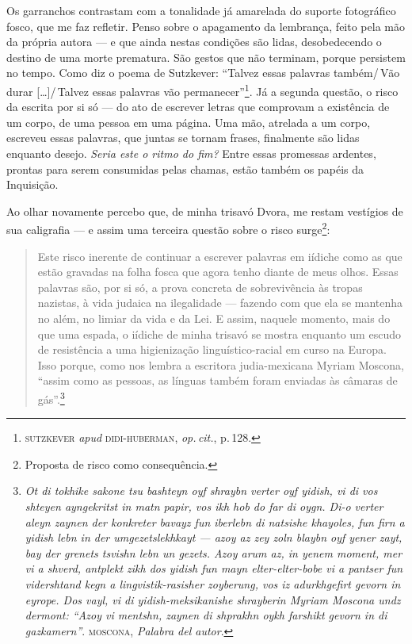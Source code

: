 Os garranchos contrastam com a tonalidade já amarelada do suporte
fotográfico fosco, que me faz refletir. Penso sobre o apagamento da
lembrança, feito pela mão da própria autora --- e que ainda nestas
condições são lidas, desobedecendo o destino de uma morte prematura. São
gestos que não terminam, porque persistem no tempo. Como diz o poema de
Sutzkever: ``Talvez essas palavras também/\,Vão durar {[}\ldots{}{]}/\,Talvez essas palavras vão permanecer''\footnote{\textsc{sutzkever}
  \emph{apud} \textsc{didi-huberman}, \emph{op.\,cit.}, p.\,128.}. Já a segunda questão, o risco
da escrita por si só --- do ato de escrever letras que comprovam a
existência de um corpo, de uma pessoa em uma página. Uma mão, atrelada a
um corpo, escreveu essas palavras, que juntas se tornam frases,
finalmente são lidas enquanto desejo. \emph{Seria este o ritmo do fim?}
Entre essas promessas ardentes, prontas para serem consumidas pelas
chamas, estão também os papéis da Inquisição.

Ao olhar novamente percebo que, de minha trisavó Dvora, me restam
vestígios de sua caligrafia --- e assim uma terceira questão sobre o
risco surge\footnote{Proposta de risco como consequência.}:


\begin{quote}
Este risco inerente de continuar a escrever
  palavras em iídiche como as que estão gravadas na folha fosca
  que agora tenho diante de meus olhos. Essas palavras são, por si só, a
  prova concreta de sobrevivência às tropas nazistas, à vida judaica na
  ilegalidade --- fazendo com que ela se mantenha no além, no limiar da
  vida e da Lei. E assim, naquele momento, mais do que uma espada, o
  iídiche de minha trisavó se mostra enquanto um escudo de
  resistência a uma higienização linguístico-racial em curso na Europa.
  Isso porque, como nos lembra a escritora judia-mexicana Myriam
  Moscona, ``assim como as pessoas, as línguas também foram
  enviadas às câmaras de gás''.\footnote{\emph{Ot di tokhike sakone tsu bashteyn oyf shraybn verter oyf yidish, vi di vos shteyen ayngekritst in matn papir, vos ikh hob do far di oygn. Di-o verter aleyn zaynen der konkreter bavayz fun iberlebn di natsishe khayoles, fun firn a yidish lebn in der umgezetslekhkayt --- azoy az zey zoln blaybn oyf yener zayt, bay der grenets tsvishn lebn un gezets. Azoy arum az, in yenem moment, mer vi a shverd, antplekt zikh dos yidish fun mayn elter-elter-bobe vi a pantser fun vidershtand kegn a lingvistik-rasisher zoyberung, vos iz adurkhgefirt gevorn in eyrope. Dos vayl, vi di yidish-meksikanishe shrayberin Myriam Moscona undz dermont: ``Azoy vi mentshn, zaynen di shprakhn oykh farshikt gevorn in di gazkamern''}. \textsc{moscona}, \emph{Palabra del autor}.}
\end{quote}

